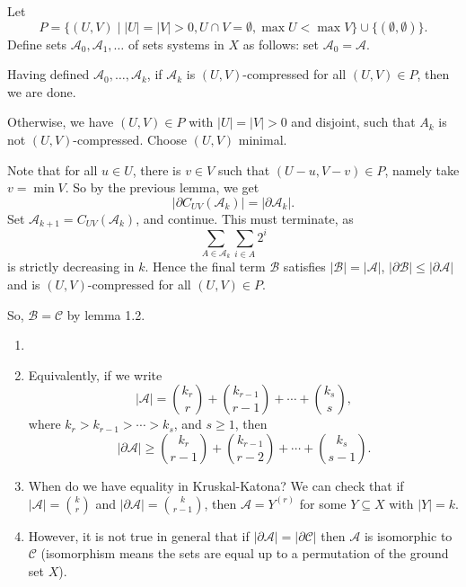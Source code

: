 \documentclass[12pt]{article}
\begin{document}
\begin{proofbox}
	Let
	\[
		P = \{(U, V) \mid |U| = |V| > 0, U \cap V = \emptyset, \max U < \max V\} \cup \{(\emptyset, \emptyset)\}.
	\]
	Define sets $\mathcal{A}_0, \mathcal{A}_1, \ldots$ of sets systems in $X$ as follows: set $\mathcal{A}_0 = \mathcal{A}$.
	
	Having defined $\mathcal{A}_0, \ldots, \mathcal{A}_k$, if $\mathcal{A}_k$ is $(U, V)$-compressed for all $(U, V) \in P$, then we are done.

	Otherwise, we have $(U, V) \in P$ with $|U| = |V| > 0$ and disjoint, such that $A_k$ is not $(U, V)$-compressed. Choose $(U, V)$ minimal.

	Note that for all $u \in U$, there is $v \in V$ such that $(U - u, V - v) \in P$, namely take $v = \min V$. So by the previous lemma, we get
	\[
	|\partial C_{UV}(\mathcal{A}_k)| = |\partial \mathcal{A}_k|.
	\]
	Set $\mathcal{A}_{k+1} = C_{UV}(\mathcal{A}_k)$, and continue. This must terminate, as
	\[
	\sum_{A \in \mathcal{A}_k} \sum_{i \in A}2^i
	\]
	is strictly decreasing in $k$. Hence the final term $\mathcal{B}$ satisfies $|\mathcal{B}| = |\mathcal{A}|$, $|\partial \mathcal{B}| \leq |\partial \mathcal{A}|$ and is $(U, V)$-compressed for all $(U, V) \in P$.

	So, $\mathcal{B} = \mathcal{C}$ by lemma 1.2.
\end{proofbox}

\begin{remark}
	\begin{enumerate}
		\item[]
		\item Equivalently, if we write
			\[
				|\mathcal{A}| = \binom{k_r}r + \binom{k_{r-1}}{r-1} + \cdots + \binom{k_s}{s},
			\]
			where $k_r > k_{r-1} > \cdots > k_s$, and $s \geq 1$, then
			\[
				|\partial \mathcal{A}| \geq \binom{k_r}{r-1} + \binom{k_{r-1}}{r-2} + \cdots + \binom{k_s}{s-1}.
			\]
		\item When do we have equality in Kruskal-Katona? We can check that if $|\mathcal{A}| = \binom kr$ and $|\partial\mathcal{A}| = \binom k{r-1}$, then $\mathcal{A} = Y^{(r)}$ for some $Y \subseteq X$ with $|Y| = k$.
		\item However, it is not true in general that if $|\partial \mathcal{A}| = |\partial \mathcal{C}|$ then $\mathcal{A}$ is isomorphic to $\mathcal{C}$ (isomorphism means the sets are equal up to a permutation of the ground set $X$).
	\end{enumerate}
\end{remark}
\end{document}

